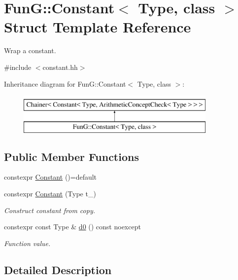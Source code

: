 \hypertarget{structFunG_1_1Constant}{\section{Fun\-G\-:\-:Constant$<$ Type, class $>$ Struct Template Reference}
\label{structFunG_1_1Constant}
}


Wrap a constant.  




{\ttfamily \#include $<$constant.\-hh$>$}

Inheritance diagram for Fun\-G\-:\-:Constant$<$ Type, class $>$\-:\begin{figure}[H]
\begin{center}
\leavevmode
\includegraphics[height=2.000000cm]{structFunG_1_1Constant}
\end{center}
\end{figure}
\subsection*{Public Member Functions}
\begin{DoxyCompactItemize}
\item 
constexpr \hyperlink{structFunG_1_1Constant_a278d28a1015016d076389b89a43bf118}{Constant} ()=default
\item 
constexpr \hyperlink{structFunG_1_1Constant_a24482c93ea4fe192f4c1a062c5b2d8a1}{Constant} (Type t\-\_\-)
\begin{DoxyCompactList}\small\item\em Construct constant from copy. \end{DoxyCompactList}\item 
constexpr const Type \& \hyperlink{structFunG_1_1Constant_a1b05280c971ecf127e61b8b52ff6b570}{d0} () const noexcept
\begin{DoxyCompactList}\small\item\em Function value. \end{DoxyCompactList}\end{DoxyCompactItemize}


\subsection{Detailed Description}
